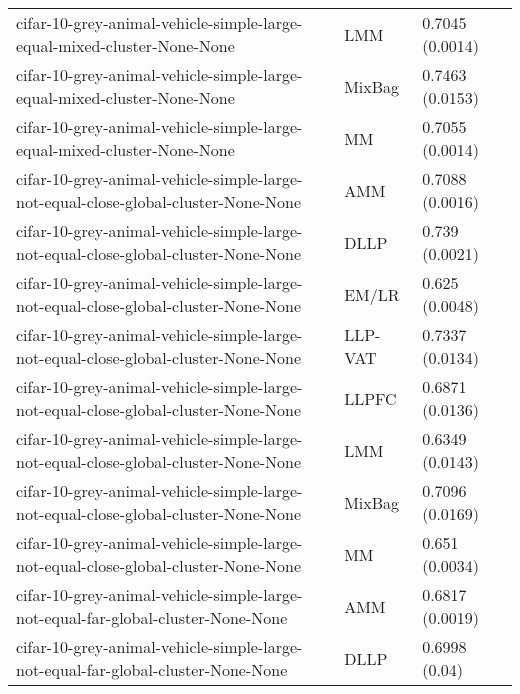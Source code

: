 \begin{longtable}{lll}
                                      cifar-10-grey-animal-vehicle-simple-large-equal-mixed-cluster-None-None &       LMM &                           0.7045 (0.0014) \\
                                      cifar-10-grey-animal-vehicle-simple-large-equal-mixed-cluster-None-None &    MixBag &                           0.7463 (0.0153) \\
                                      cifar-10-grey-animal-vehicle-simple-large-equal-mixed-cluster-None-None &        MM &                           0.7055 (0.0014) \\
                           cifar-10-grey-animal-vehicle-simple-large-not-equal-close-global-cluster-None-None &       AMM &                           0.7088 (0.0016) \\
                           cifar-10-grey-animal-vehicle-simple-large-not-equal-close-global-cluster-None-None &      DLLP &                            0.739 (0.0021) \\
                           cifar-10-grey-animal-vehicle-simple-large-not-equal-close-global-cluster-None-None &     EM/LR &                            0.625 (0.0048) \\
                           cifar-10-grey-animal-vehicle-simple-large-not-equal-close-global-cluster-None-None &   LLP-VAT &                           0.7337 (0.0134) \\
                           cifar-10-grey-animal-vehicle-simple-large-not-equal-close-global-cluster-None-None &     LLPFC &                           0.6871 (0.0136) \\
                           cifar-10-grey-animal-vehicle-simple-large-not-equal-close-global-cluster-None-None &       LMM &                           0.6349 (0.0143) \\
                           cifar-10-grey-animal-vehicle-simple-large-not-equal-close-global-cluster-None-None &    MixBag &                           0.7096 (0.0169) \\
                           cifar-10-grey-animal-vehicle-simple-large-not-equal-close-global-cluster-None-None &        MM &                            0.651 (0.0034) \\
                             cifar-10-grey-animal-vehicle-simple-large-not-equal-far-global-cluster-None-None &       AMM &                           0.6817 (0.0019) \\
                             cifar-10-grey-animal-vehicle-simple-large-not-equal-far-global-cluster-None-None &      DLLP &                             0.6998 (0.04) \\

\end{longtable}
